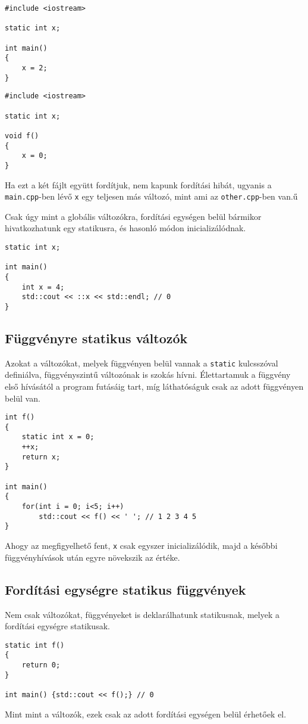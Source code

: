 \documentclass[a4paper,11.5pt]{article}
\begin{document}
	\begin{lstlisting}
#include <iostream>

static int x;

int main()
{
	x = 2;
}
	\end{lstlisting}
	\medskip
	
	\begin{lstlisting}
#include <iostream>

static int x;

void f()
{
	x = 0;
}
	\end{lstlisting}
	Ha ezt a két fájlt együtt fordítjuk, nem kapunk fordítási hibát, ugyanis a \texttt{main.cpp}-ben lévő \texttt{x} egy teljesen más változó, mint ami az \texttt{other.cpp}-ben van.ű
	
	\smallskip
	Csak úgy mint a globális változókra, fordítási egységen belül bármikor hivatkozhatunk egy statikusra, és hasonló módon inicializálódnak.
	\begin{lstlisting}
static int x;

int main()
{
	int x = 4;
	std::cout << ::x << std::endl; // 0
}
	\end{lstlisting}
	\subsection{Függvényre statikus változók}
	Azokat a változókat, melyek függvényen belül vannak a \texttt{static} kulcsszóval definiálva, függvényszintű változónak is szokás hívni. Élettartamuk a függvény első hívásától a program futásáig tart, míg láthatóságuk csak az adott függvényen belül van.
	
	\begin{lstlisting}
int f()
{
	static int x = 0;
	++x;
	return x;
}

int main() 
{
	for(int i = 0; i<5; i++)
		std::cout << f() << ' '; // 1 2 3 4 5
}
	\end{lstlisting}
	Ahogy az megfigyelhető fent, \texttt{x} csak egyszer inicializálódik, majd a későbbi függvényhívások után egyre növekszik az értéke.
	\subsection{Fordítási egységre statikus függvények}
	Nem csak változókat, függvényeket is deklarálhatunk statikusnak, melyek a fordítási egységre statikusak.
	\begin{lstlisting}
static int f()
{
	return 0;
}

int main() {std::cout << f();} // 0
	\end{lstlisting}
	Mint mint a változók, ezek csak az adott fordítási egységen belül érhetőek el.
\end{document}
